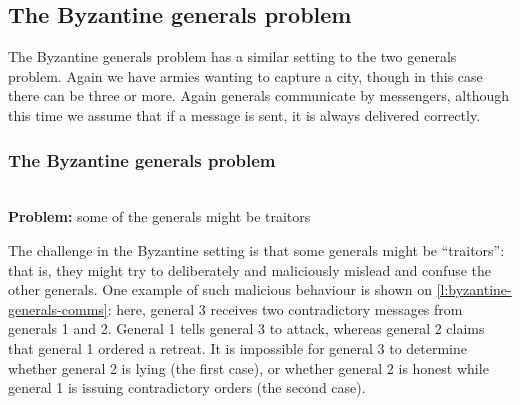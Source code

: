 \subsection{The Byzantine generals problem}\label{sec:byzantine}

The Byzantine generals problem \citep{Lamport:1982} has a similar setting to the two generals problem.
Again we have armies wanting to capture a city, though in this case there can be three or more.
Again generals communicate by messengers, although this time we assume that if a message is sent, it is always delivered correctly.

\begin{frame}
    \label{s:byzantine-generals}
    \frametitle{The Byzantine generals problem}
    \begin{center}
        \\[1.5em]
        \textbf{Problem:} some of the generals might be traitors
    \end{center}
\end{frame}
\label{l:byzantine-generals}

The challenge in the Byzantine setting is that some generals might be ``traitors'': that is, they might try to deliberately and maliciously mislead and confuse the other generals.
One example of such malicious behaviour is shown on \autoref{l:byzantine-generals-comms}: here, general 3 receives two contradictory messages from generals 1 and 2.
General 1 tells general 3 to attack, whereas general 2 claims that general 1 ordered a retreat.
It is impossible for general 3 to determine whether general 2 is lying (the first case), or whether general 2 is honest while general 1 is issuing contradictory orders (the second case).

